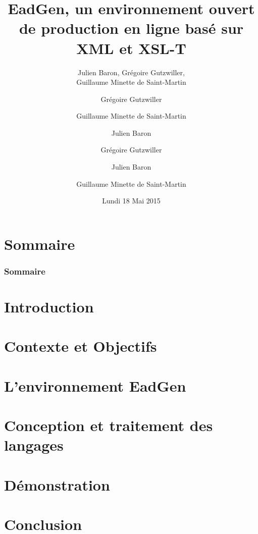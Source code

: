 \documentclass[11pt, handout]{beamer}
\title[EadGen]{EadGen, un environnement ouvert de production en ligne basé sur 
XML et XSL-T}
\author{Julien Baron, Grégoire Gutzwiller, \\ Guillaume Minette de Saint-Martin}
\date[18/05/2015]{Lundi 18 Mai 2015}
\begin{document}
\begin{frame}[plain]
	\maketitle
\end{frame}

\author{Grégoire Gutzwiller}
\section*{Sommaire}
\begin{frame}
	\frametitle{Sommaire}
	\tableofcontents
\end{frame}

\section{Introduction}


\author{Guillaume Minette de Saint-Martin}
\section{Contexte et Objectifs}


\author{Julien Baron}
\section{L'environnement EadGen}


\author{Grégoire Gutzwiller}
\section{Conception et traitement des langages}


\author{Julien Baron}
\section{Démonstration}


\author{Guillaume Minette de Saint-Martin}
\section{Conclusion}

\end{document}
